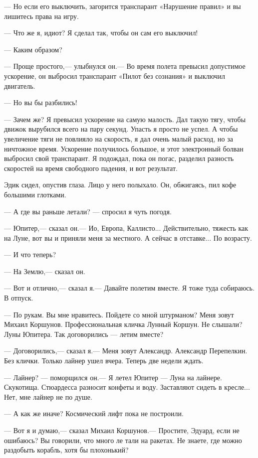 \documentclass[11pt,a4paper,oneside]{article}
\begin{document}
— Но если его выключить, загорится транспарант «Нарушение правил» и вы лишитесь права на игру.

— Что же я, идиот? Я сделал так, чтобы он сам его выключил!

— Каким образом?

— Проще простого,— улыбнулся он.— Во время полета превысил допустимое ускорение, он выбросил транспарант «Пилот без сознания» и выключил двигатель.

— Но вы бы разбились!

— Зачем же? Я превысил ускорение на самую малость. Дал такую тягу, чтобы движок вырубился всего на пару секунд. Упасть я просто не успел. А чтобы увеличение тяги не повлияло на скорость, я дал очень малый расход, но за ничтожное время. Ускорение получилось большое, и этот электронный болван выбросил свой транспарант. Я подождал, пока он погас, разделил разность скоростей на время свободного падения, и вот результат.

Эдик сидел, опустив глаза. Лицо у него полыхало. Он, обжигаясь, пил кофе большими глотками.

— А где вы раньше летали? — спросил я чуть погодя.

— Юпитер,— сказал он.— Ио, Европа, Каллисто... Действительно, тяжесть как на Луне, вот вы и приняли меня за местного. А сейчас в отставке... По возрасту.

— И что теперь?

— На Землю,— сказал он.

— Вот и отлично,— сказал я.— Давайте полетим вместе. Я тоже туда собираюсь. В отпуск.

— По рукам. Вы мне нравитесь. Пойдете со мной штурманом? Меня зовут Михаил Коршунов. Профессиональная кличка Лунный Коршун. Не слышали? Луны Юпитера. Так договорились — летим вместе?

— Договорились,— сказал я.— Меня зовут Александр. Александр Перепелкин. Без клички. Только лайнер ушел вчера. Теперь две недели ждать.

— Лайнер? — поморщился он.— Я летел Юпитер — Луна на лайнере. Скукотища. Стюардесса разносит конфеты и воду. Заставляют сидеть в кресле... Нет, мне лайнер не по душе.

— А как же иначе? Космический лифт пока не построили.

— Вот я и думаю,— сказал Михаил Коршунов.— Простите, Эдуард, если не ошибаюсь? Вы говорили, что много ле тали на ракетах. Не знаете, где можно раздобыть корабль, хотя бы плохонький?
\end{document}
